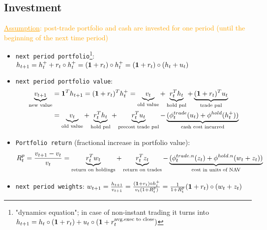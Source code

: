 \subsection{Investment}
\textcolor{orange}{\underline{Assumption}: post-trade portfolio and cash are invested for one period (until the beginning of the next time period)}
\begin{itemize}
	\item \texttt{next period portfolio}\footnote{"dynamics equation"; in case of non-instant trading it turns into $h_{t+1} = h_t \circ (\textbf{1} + r_t) + u_t \circ (\textbf{1} + r^{\text{avg.exec to close}}_t)$}: $h_{t+1} = h_t^+ + r_t \circ h_t^+ = (\textbf{1} + r_t) \circ h_t^+=(\textbf{1} + r_t) \circ (h_t+u_t)$
	\item \texttt{next period portfolio value}: 
	\begin{align*}
	\underbrace{v_{t+1}}_{\text{new value}} &= \textbf{1}^T h_{t+1} = (\textbf{1}+r_t)^T h_t^+ = \underbrace{v_t}_{\text{old value}} + \underbrace{r_t ^T h_t}_{\text{hold pnl}} + \underbrace{(\textbf{1} + r_t)^T u_t}_{\text{trade pnl}}\\
		&= \underbrace{v_t}_{\text{old value}} + \underbrace{r_t ^T h_t}_{\text{hold pnl}} + \underbrace{r_t^T u_t}_{\text{precost trade pnl}} - \underbrace{(\phi^{trade}_t(u_t) + \phi^{hold}(h_t^+))}_{\text{cash cost incurred}}
	\end{align*}
	\item \texttt{Portfolio return} (fractional increase in portfolio value): 
	\begin{align}
	R^p_t = \frac{v_{t+1} - v_t}{v_t} = \underbrace{r_t ^T w_t}_{\text{return on holdings}} + \underbrace{r_t^T z_t}_{\text{return on trades}}- \underbrace{(\phi^{trade.n}_t(z_t) + \phi^{hold.n}(w_t+z_t))}_{\text{cost in units of NAV}}
	\end{align}
	\item \texttt{next period weights}: $w_{t+1} = \frac{h_{t+1}}{v_{t+1}}=\frac{(\textbf{1} + r_t) \circ h_t^+}{v_t(1+R^p_t)}=\frac{1}{1+R^p_t}  (\textbf{1} + r_t) \circ (w_t+z_t)$
\end{itemize}
